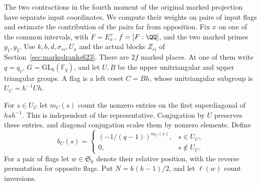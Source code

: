 \documentclass[a4paper,11pt]{article}
\theoremstyle{definition}
\theoremstyle{remark}
\numberwithin{equation}{section}
\begin{document}
The two contractions in the fourth moment of the original marked
projection have separate input coordinates. We compute their
weights on pairs of input flags and estimate the contribution of
the pairs far from opposition. Fix \(x\) on one of the common
intervals, with \(F=E_x^+\), \(f=[F:\QQ]\), and the two marked
primes \(g_1,g_2\). Use \(k,b,d,\sigma_{ri},U_x\) and the actual
blocks \(Z_{ri}\) of Section~\ref{sec:markedranks623}. There are
\(2f\) marked places. At one of them write \(q=q_v\),
\(G=\mathrm{GL}_k(\mathbb F_q)\), and let \(U,B\) be the upper
unitriangular and upper triangular groups. A flag is a left
coset \(C=Bh\), whose unitriangular subgroup is \(U_C=h^{-1}Uh\).

For \(s\in U_C\) let \(m_C(s)\) count the nonzero entries on the
first superdiagonal of \(hsh^{-1}\). This is independent of the
representative. Conjugation by \(U\) preserves these entries,
and diagonal conjugation scales them by nonzero elements. Define
\[
 b_C(s)=
 \begin{cases}
       (-1/(q-1))^{m_C(s)},&s\in U_C,\\
       0,&s\notin U_C .
 \end{cases}
\]
For a pair of flags let \(w\in\mathfrak S_k\) denote their relative
position, with the reverse permutation for opposite flags.
Put \(N=k(k-1)/2\), and let \(\ell(w)\) count inversions.
\end{document}
